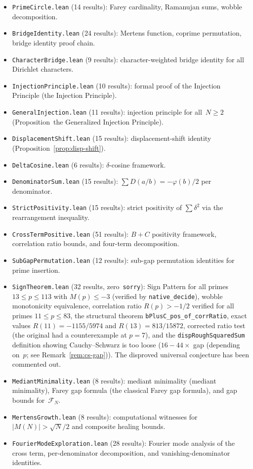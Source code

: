\documentclass[11pt]{article}
\theoremstyle{definition}
\newcommand{\F}{\mathcal{F}}
\begin{document}
\begin{itemize}
  \item \texttt{PrimeCircle.lean} (14 results): Farey cardinality,
    Ramanujan sums, wobble decomposition.
  \item \texttt{BridgeIdentity.lean} (24 results): Mertens function,
    coprime permutation, bridge identity proof chain.
  \item \texttt{CharacterBridge.lean} (9 results): character-weighted
    bridge identity for all Dirichlet characters.
  \item \texttt{InjectionPrinciple.lean} (10 results): formal proof
    of the Injection Principle (the Injection Principle).
  \item \texttt{GeneralInjection.lean} (11 results): injection
    principle for all~$N \ge 2$ (Proposition~the Generalized Injection Principle).
  \item \texttt{DisplacementShift.lean} (15 results):
    displacement-shift identity
    (Proposition~\ref{prop:disp-shift}).
  \item \texttt{DeltaCosine.lean} (6 results):
    $\delta$-cosine framework.
  \item \texttt{DenominatorSum.lean} (15 results):
    $\sum D(a/b) = -\varphi(b)/2$ per denominator.
  \item \texttt{StrictPositivity.lean} (15 results):
    strict positivity of $\sum \delta^2$
    via the rearrangement inequality.
  \item \texttt{CrossTermPositive.lean} (51 results):
    $B + C$ positivity framework, correlation ratio bounds,
    and four-term decomposition.
  \item \texttt{SubGapPermutation.lean} (12 results):
    sub-gap permutation identities for prime insertion.

  \item \texttt{SignTheorem.lean} (32 results,
    zero~\texttt{sorry}): Sign Pattern for all primes
    $13 \le p \le 113$ with $M(p) \le -3$ (verified by \texttt{native\_decide}), wobble
    monotonicity equivalence, correlation ratio $R(p) > -1/2$
    verified for all primes $11 \le p \le 83$,
    the structural theorem \texttt{bPlusC\_pos\_of\_corrRatio},
    exact values $R(11) = -1155/5974$ and $R(13) = 813/15872$,
    corrected ratio test (the original had a counterexample at $p = 7$),
    and the \texttt{dispRoughSquaredSum} definition showing
    Cauchy--Schwarz is too loose ($16{-}44\times$ gap (depending on~$p$; see Remark~\ref{rem:cs-gap})).
    The disproved universal conjecture has been commented out.
  \item \texttt{MediantMinimality.lean} (8 results):
    mediant minimality (mediant minimality),
    Farey gap formula (the classical Farey gap formula),
    and gap bounds for~$\F_N$.
  \item \texttt{MertensGrowth.lean} (8 results):
    computational witnesses for $|M(N)| > \sqrt{N}/2$
    and composite healing bounds.
  \item \texttt{FourierModeExploration.lean} (28 results):
    Fourier mode analysis of the cross term, per-denominator
    decomposition, and vanishing-denominator identities.
\end{itemize}
\end{document}
